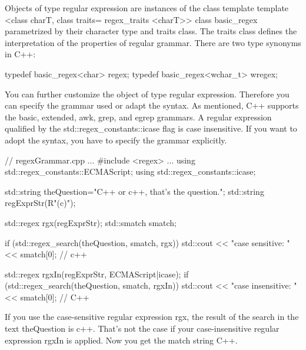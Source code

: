 

Objects of type regular expression are instances of the class template template <class charT, class traits= regex\_traits <charT>{}> class basic\_regex parametrized by their character type and traits class. The traits class defines the interpretation of the properties of regular grammar. There are two type synonyms in C++:

\begin{cpp}
typedef basic_regex<char> regex;
typedef basic_regex<wchar_t> wregex;
\end{cpp}

You can further customize the object of type regular expression. Therefore you can specify the grammar used or adapt the syntax. As mentioned, C++ supports the basic, extended, awk, grep, and egrep grammars. A regular expression qualified by the std::regex\_constants::icase flag is case insensitive. If you want to adopt the syntax, you have to specify the grammar explicitly.


\begin{cpp}
// regexGrammar.cpp
...
#include <regex>
...
using std::regex_constants::ECMAScript;
using std::regex_constants::icase;

std::string theQuestion="C++ or c++, that's the question.";
std::string regExprStr(R"(c\+\+)");

std::regex rgx(regExprStr);
std::smatch smatch;

if (std::regex_search(theQuestion, smatch, rgx)){
	std::cout << "case sensitive: " << smatch[0]; // c++
}

std::regex rgxIn(regExprStr, ECMAScript|icase);
if (std::regex_search(theQuestion, smatch, rgxIn)){
	std::cout << "case insensitive: " << smatch[0]; // C++
}
\end{cpp}

If you use the case-sensitive regular expression rgx, the result of the search in the text theQuestion is c++. That’s not the case if your case-insensitive regular expression rgxIn is applied. Now you get the match string C++.



























